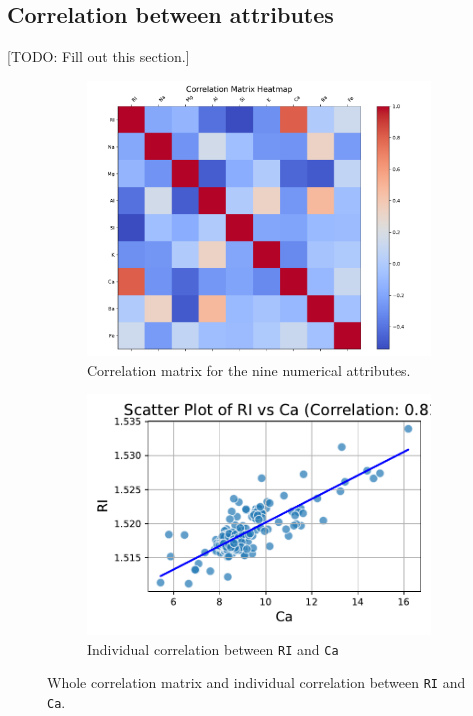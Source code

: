\documentclass[dtu]{dtuarticle}
\newcommand{\todo}[1]{\color{red}[TODO: #1]\color{black}}
\begin{document}
	\subsection{Correlation between attributes}

	\todo{Fill out this section.}

	\begin{figure}[h!]
		\centering
		\begin{subfigure}{.49\textwidth}
			\centering
			\includegraphics[width=\textwidth]{figures/correlation_matrix}
			\caption{Correlation matrix for the nine numerical attributes.}
			\label{fig:correlation}
		\end{subfigure}
		\begin{subfigure}{.49\textwidth}
			\centering
			\includegraphics[width=\textwidth]{figures/scatter_RI_vs_Ca}
			\caption{Individual correlation between \texttt{RI} and \texttt{Ca}}
			\label{fig:individual-correlation}
		\end{subfigure}
		\caption{Whole correlation matrix and individual correlation between \texttt{RI} and \texttt{Ca}.}
	\end{figure}
\end{document}
